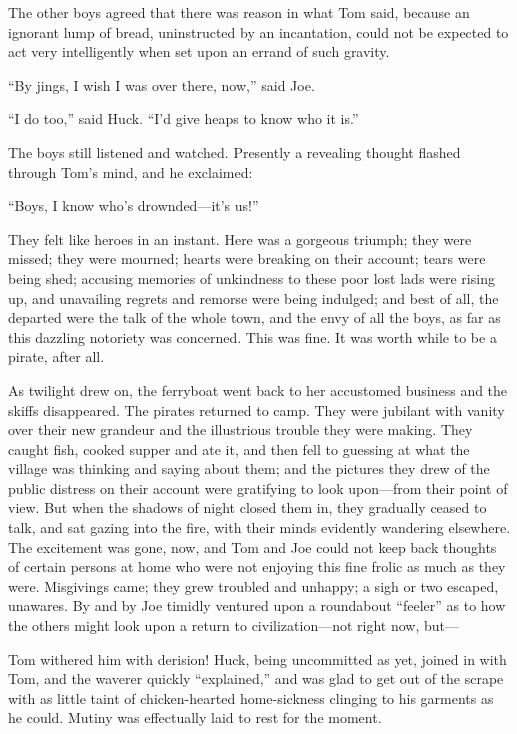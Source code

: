 \documentclass{book}
\begin{document}
The other boys agreed that there was reason in what Tom said, because an ignorant lump of bread, uninstructed by an incantation, could not be expected to act very intelligently when set upon an errand of such gravity.

“By jings, I wish I was over there, now,” said Joe.

“I do too,” said Huck. “I’d give heaps to know who it is.”

The boys still listened and watched. Presently a revealing thought flashed through Tom’s mind, and he exclaimed:

“Boys, I know who’s drownded—it’s us!”

They felt like heroes in an instant. Here was a gorgeous triumph; they were missed; they were mourned; hearts were breaking on their account; tears were being shed; accusing memories of unkindness to these poor lost lads were rising up, and unavailing regrets and remorse were being indulged; and best of all, the departed were the talk of the whole town, and the envy of all the boys, as far as this dazzling notoriety was concerned. This was fine. It was worth while to be a pirate, after all.

As twilight drew on, the ferryboat went back to her accustomed business and the skiffs disappeared. The pirates returned to camp. They were jubilant with vanity over their new grandeur and the illustrious trouble they were making. They caught fish, cooked supper and ate it, and then fell to guessing at what the village was thinking and saying about them; and the pictures they drew of the public distress on their account were gratifying to look upon—from their point of view. But when the shadows of night closed them in, they gradually ceased to talk, and sat gazing into the fire, with their minds evidently wandering elsewhere. The excitement was gone, now, and Tom and Joe could not keep back thoughts of certain persons at home who were not enjoying this fine frolic as much as they were. Misgivings came; they grew troubled and unhappy; a sigh or two escaped, unawares. By and by Joe timidly ventured upon a roundabout “feeler” as to how the others might look upon a return to civilization—not right now, but—

Tom withered him with derision! Huck, being uncommitted as yet, joined in with Tom, and the waverer quickly “explained,” and was glad to get out of the scrape with as little taint of chicken-hearted home-sickness clinging to his garments as he could. Mutiny was effectually laid to rest for the moment.
\end{document}
